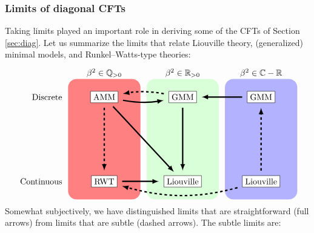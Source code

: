 \documentclass[12pt, a4paper]{article}
\theoremstyle{break}
\begin{document}
\subsubsection{Limits of diagonal CFTs}\label{sec:lod}

Taking limits played an important role in deriving some of the CFTs of Section \ref{sec:diag}. 
Let us summarize the limits that relate Liouville theory, (generalized) minimal models, and Runkel--Watts-type theories: 
\begin{align}
\begin{tikzpicture}[scale = .25, baseline=(current  bounding  box.center)]
\fill[red!50, rounded corners = 10] (-6, -10) rectangle (6, 10);
\fill[green!15, rounded corners = 10] (7, -10) rectangle (19, 10);
\fill[blue!30, rounded corners = 10] (20, -10) rectangle (32, 10);
\node at (0, 11) {$\beta^2\in\mathbb{Q}_{>0}$};
\node at (13, 11) {$\beta^2\in\mathbb{R}_{>0}$};
\node at (26, 11) {$\beta^2\in \mathbb{C}-\mathbb{R}$};
\node[left] at (-6.5, 7) {Discrete};
\node[left] at (-6.5, -7) {Continuous};
\draw (0, 7) node[draw, fill = white] (mm) {AMM};
\draw (13, 7) node[draw, fill = white] (gmm1) {GMM};
\draw (26, 7) node[draw, fill = white] (gmm2) {GMM};
\draw (0, -7) node[draw, fill = white] (rwt) {RWT};
\draw (13, -7) node[draw, fill = white] (clo) {Liouville};
\draw (26, -7) node[draw, fill = white] (liou) {Liouville};
\draw [ultra thick, shorten <= 2mm, shorten >= 2mm, -latex, 
       out = -10, in = -170] (mm) to (gmm1);
\draw [ultra thick, shorten <= 2mm, shorten >= 2mm, -latex, dashed,
       out = 170, in = 10] (gmm1) to (mm);
\draw [ultra thick, shorten <= 2mm, shorten >= 2mm, -latex] (gmm2) to (gmm1);
\draw [ultra thick, shorten <= 2mm, shorten >= 2mm, -latex] (mm) to (clo);
\draw [ultra thick, shorten <= 2mm, shorten >= 2mm, -latex, dashed] (mm) to (rwt);
\draw [ultra thick, shorten <= 2mm, shorten >= 2mm, -latex] (rwt) to (clo);
\draw [ultra thick, shorten <= 2mm, shorten >= 2mm, -latex] (gmm1) to (clo);
\draw [ultra thick, shorten <= 2mm, shorten >= 2mm, -latex,
       out = -165, in = -15, dashed] (liou) to (rwt);
\draw [ultra thick, shorten <= 2mm, shorten >= 2mm, -latex, dashed] (liou) to (gmm2);
\end{tikzpicture}
\label{lims}
\end{align}
Somewhat subjectively, we have distinguished limits that are straightforward (full arrows) from limits that are subtle (dashed arrows). The subtle limits are:
\end{document}
